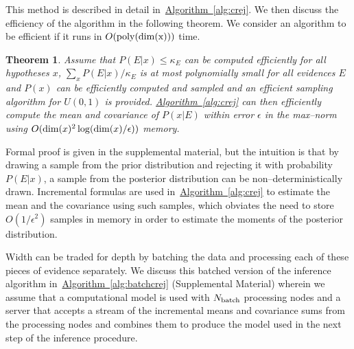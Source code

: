 \documentclass[twoside]{article}
\newtheorem{theorem}{Theorem}
\newcommand{\alg}[1]{\hyperref[alg:#1]{Algorithm~\ref*{alg:#1}}}
\begin{document}
This method is described in detail in~\alg{crej}. We then discuss the efficiency of the algorithm in the following theorem.
We consider an algorithm to be efficient if it runs in $O(\rm{poly}({\rm dim}(x)))$ time.



\begin{theorem}
Assume that $P(E|x)\le \kappa_E$ can be computed efficiently for all hypotheses $x$, $\sum_x P(E|x)/\kappa_E$ is at most polynomially small for all
evidences $E$ and $P(x)$ can be efficiently computed and sampled and an efficient sampling algorithm for $U(0,1)$ is provided.  \alg{crej} 
can then efficiently compute the mean and covariance of $P(x|E)$ within error $\epsilon$ in the max--norm using $O({\rm dim}(x)^2\log({\rm dim}(x)/\epsilon))$ memory.\label{thm:crej}
\end{theorem}
Formal proof is given in the supplemental material, but the intuition is that by drawing a
sample from the prior distribution and rejecting it with probability $P(E|x)$, a sample from
the posterior distribution can be non--deterministically drawn.  Incremental formulas are
used in~\alg{crej} to estimate the mean and the covariance using such samples, which obviates the need
to store $O(1/\epsilon^2)$ samples in memory in order to estimate the moments of the posterior distribution.

Width can be traded for depth by batching the data and processing each of
these pieces of evidence separately. We discuss this batched version of the
inference algorithm in~\alg{batchcrej} (Supplemental Material) wherein we
assume that a computational model is used with $N_{\rm batch}$ processing
nodes and a server that accepts a stream of the incremental means and
covariance sums from the processing nodes and combines them to produce the
model used in the next step of the inference procedure.
\end{document}
